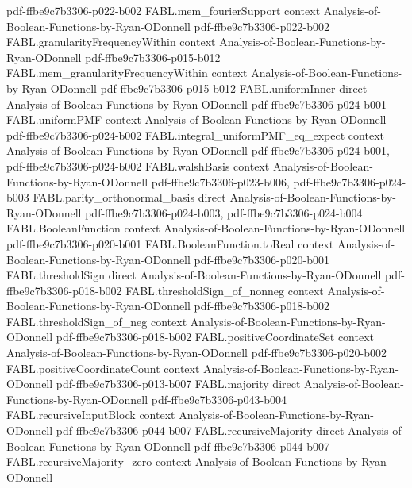 \begin{theorem}
  {pdf-ffbe9c7b3306-p022-b002}
\proofstep
  {FABL.mem_fourierSupport}
  {context}
  {Analysis-of-Boolean-Functions-by-Ryan-ODonnell}
  {pdf-ffbe9c7b3306-p022-b002}
\proofstep
  {FABL.granularityFrequencyWithin}
  {context}
  {Analysis-of-Boolean-Functions-by-Ryan-ODonnell}
  {pdf-ffbe9c7b3306-p015-b012}
\proofstep
  {FABL.mem_granularityFrequencyWithin}
  {context}
  {Analysis-of-Boolean-Functions-by-Ryan-ODonnell}
  {pdf-ffbe9c7b3306-p015-b012}
\proofstep
  {FABL.uniformInner}
  {direct}
  {Analysis-of-Boolean-Functions-by-Ryan-ODonnell}
  {pdf-ffbe9c7b3306-p024-b001}
\proofstep
  {FABL.uniformPMF}
  {context}
  {Analysis-of-Boolean-Functions-by-Ryan-ODonnell}
  {pdf-ffbe9c7b3306-p024-b002}
\proofstep
  {FABL.integral_uniformPMF_eq_expect}
  {context}
  {Analysis-of-Boolean-Functions-by-Ryan-ODonnell}
  {pdf-ffbe9c7b3306-p024-b001,
    pdf-ffbe9c7b3306-p024-b002}
\proofstep
  {FABL.walshBasis}
  {context}
  {Analysis-of-Boolean-Functions-by-Ryan-ODonnell}
  {pdf-ffbe9c7b3306-p023-b006,
    pdf-ffbe9c7b3306-p024-b003}
\proofstep
  {FABL.parity_orthonormal_basis}
  {direct}
  {Analysis-of-Boolean-Functions-by-Ryan-ODonnell}
  {pdf-ffbe9c7b3306-p024-b003,
    pdf-ffbe9c7b3306-p024-b004}
\proofstep
  {FABL.BooleanFunction}
  {context}
  {Analysis-of-Boolean-Functions-by-Ryan-ODonnell}
  {pdf-ffbe9c7b3306-p020-b001}
\proofstep
  {FABL.BooleanFunction.toReal}
  {context}
  {Analysis-of-Boolean-Functions-by-Ryan-ODonnell}
  {pdf-ffbe9c7b3306-p020-b001}
\proofstep
  {FABL.thresholdSign}
  {direct}
  {Analysis-of-Boolean-Functions-by-Ryan-ODonnell}
  {pdf-ffbe9c7b3306-p018-b002}
\proofstep
  {FABL.thresholdSign_of_nonneg}
  {context}
  {Analysis-of-Boolean-Functions-by-Ryan-ODonnell}
  {pdf-ffbe9c7b3306-p018-b002}
\proofstep
  {FABL.thresholdSign_of_neg}
  {context}
  {Analysis-of-Boolean-Functions-by-Ryan-ODonnell}
  {pdf-ffbe9c7b3306-p018-b002}
\proofstep
  {FABL.positiveCoordinateSet}
  {context}
  {Analysis-of-Boolean-Functions-by-Ryan-ODonnell}
  {pdf-ffbe9c7b3306-p020-b002}
\proofstep
  {FABL.positiveCoordinateCount}
  {context}
  {Analysis-of-Boolean-Functions-by-Ryan-ODonnell}
  {pdf-ffbe9c7b3306-p013-b007}
\proofstep
  {FABL.majority}
  {direct}
  {Analysis-of-Boolean-Functions-by-Ryan-ODonnell}
  {pdf-ffbe9c7b3306-p043-b004}
\proofstep
  {FABL.recursiveInputBlock}
  {context}
  {Analysis-of-Boolean-Functions-by-Ryan-ODonnell}
  {pdf-ffbe9c7b3306-p044-b007}
\proofstep
  {FABL.recursiveMajority}
  {direct}
  {Analysis-of-Boolean-Functions-by-Ryan-ODonnell}
  {pdf-ffbe9c7b3306-p044-b007}
\proofstep
  {FABL.recursiveMajority_zero}
  {context}
  {Analysis-of-Boolean-Functions-by-Ryan-ODonnell}

\end{theorem}
